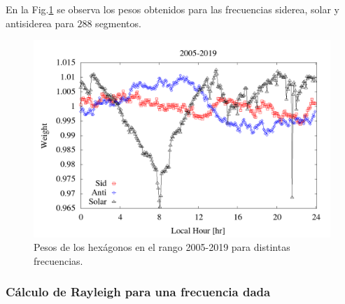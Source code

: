      En la Fig.\ref{fig:pesos_ejemplo} se observa los pesos obtenidos para las frecuencias siderea, solar y antisiderea para $288$ segmentos.

        \begin{figure}[H]
          \centering
              \includegraphics[width=0.85\linewidth]{../report_2_27_04_2020/Graficos/weigth2005-2019.png}
              \caption{Pesos de los hexágonos en el rango 2005-2019 para distintas frecuencias.}
              \label{fig:pesos_ejemplo}
        \end{figure}

  \subsubsection{Cálculo de Rayleigh para una frecuencia dada}


